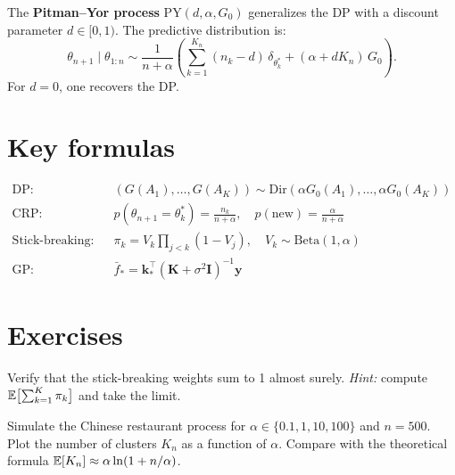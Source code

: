 \begin{definition}
The \textbf{Pitman--Yor process} $\mathrm{PY}(d, \alpha, G_0)$ generalizes
the DP with a discount parameter $d \in [0,1)$. The predictive distribution is:
\[
  \theta_{n+1} \mid \theta_{1:n} \sim
  \frac{1}{n + \alpha}\left(\sum_{k=1}^{K_n}(n_k - d)\,\delta_{\theta_k^*}
  + (\alpha + d K_n)\,G_0\right).
\]
For $d = 0$, one recovers the DP.
\end{definition}

\section{Key formulas}

\begin{keyformulas}
\begin{align}
  \text{DP:} \quad & (G(A_1), \ldots, G(A_K)) \sim \mathrm{Dir}(\alpha G_0(A_1), \ldots, \alpha G_0(A_K)) \\
  \text{CRP:} \quad & p(\theta_{n+1} = \theta_k^*) = \frac{n_k}{n + \alpha}, \quad
                        p(\text{new}) = \frac{\alpha}{n + \alpha} \\
  \text{Stick-breaking:} \quad & \pi_k = V_k \prod_{j<k}(1-V_j), \quad V_k \sim \mathrm{Beta}(1,\alpha) \\
  \text{GP:} \quad & \bar{f}_* = \mathbf{k}_*^\top(\mathbf{K}+\sigma^2\mathbf{I})^{-1}\mathbf{y}
\end{align}
\end{keyformulas}

\section{Exercises}

\begin{exercise}
Verify that the stick-breaking weights sum to 1 almost surely.
\emph{Hint:} compute $\mathbb{E}\bigl[\sum_{k=1}^K \pi_k\bigr]$ and take the limit.
\end{exercise}

\begin{exercise}
Simulate the Chinese restaurant process for $\alpha \in \{0.1, 1, 10, 100\}$
and $n = 500$. Plot the number of clusters $K_n$ as a function of $\alpha$.
Compare with the theoretical formula $\mathbb{E}[K_n] \approx \alpha \ln(1 + n/\alpha)$.
\end{exercise}


